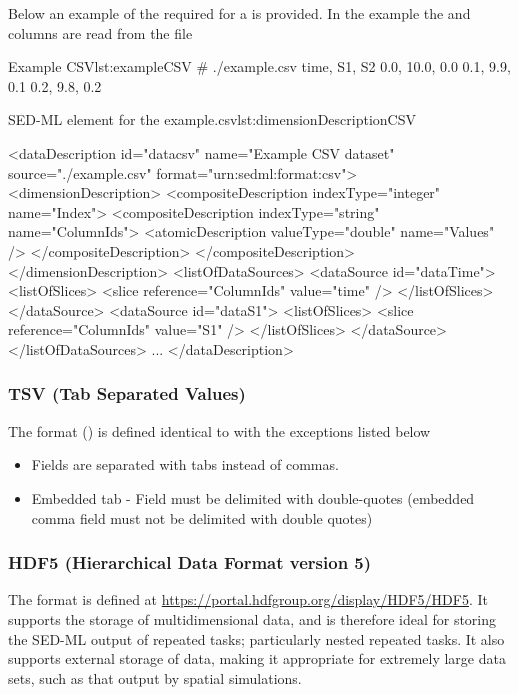Below an example of the required \hyperref[sec:dimensionDescription]{} for a  is provided. In the example the  and  columns are read from the  file
\begin{myXmlLst}{Example CSV}{lst:exampleCSV}
# ./example.csv
time, S1, S2
0.0, 10.0, 0.0
0.1, 9.9, 0.1
0.2, 9.8, 0.2
\end{myXmlLst}

\begin{myXmlLst}{SED-ML  element for the example.csv}{lst:dimensionDescriptionCSV}

<dataDescription id="datacsv" name="Example CSV dataset" source="./example.csv" format="urn:sedml:format:csv">
  <dimensionDescription>
    <compositeDescription indexType="integer" name="Index">
      <compositeDescription indexType="string" name="ColumnIds">
        <atomicDescription valueType="double" name="Values" />
      </compositeDescription>
    </compositeDescription>
  </dimensionDescription>
  <listOfDataSources>
    <dataSource id="dataTime">
      <listOfSlices>
        <slice reference="ColumnIds" value="time" />
      </listOfSlices>
    </dataSource>
    <dataSource id="dataS1">
      <listOfSlices>
        <slice reference="ColumnIds" value="S1" />
      </listOfSlices>
    </dataSource>
  </listOfDataSources>
  ...          
</dataDescription>
\end{myXmlLst} 

\subsubsection{TSV (Tab Separated Values)}
\label{sec:dataFormatTSV}
The format  () is defined identical to \hyperref[sec:dataFormatCSV]{} with the exceptions listed below
\begin{itemize}
    \item Fields are separated with tabs instead of commas.
    \item Embedded tab - Field must be delimited with double-quotes (embedded comma field must not be delimited with double quotes)
\end{itemize}


\subsubsection{HDF5 (Hierarchical Data Format version 5)}
\label{sec:dataFormatHDF5}
The format  is defined at \url{https://portal.hdfgroup.org/display/HDF5/HDF5}.  It supports the storage of multidimensional data, and is therefore ideal for storing the SED-ML output of repeated tasks; particularly nested repeated tasks.  It also supports external storage of data, making it appropriate for extremely large data sets, such as that output by spatial simulations.

